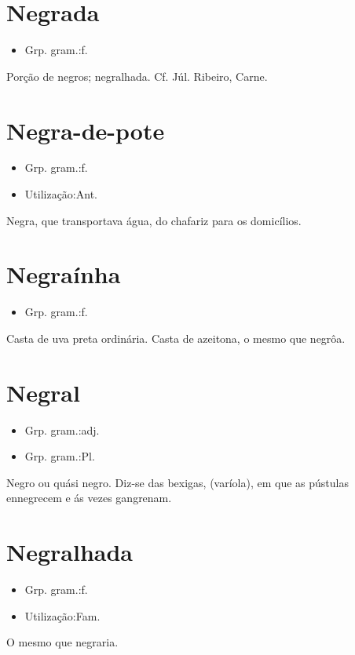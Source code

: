 \section{Negrada}
\begin{itemize}
\item {Grp. gram.:f.}
\end{itemize}
Porção de negros; negralhada. Cf. Júl. Ribeiro, \textunderscore Carne\textunderscore .
\section{Negra-de-pote}
\begin{itemize}
\item {Grp. gram.:f.}
\end{itemize}
\begin{itemize}
\item {Utilização:Ant.}
\end{itemize}
Negra, que transportava água, do chafariz para os domicílios.
\section{Negraínha}
\begin{itemize}
\item {Grp. gram.:f.}
\end{itemize}
Casta de uva preta ordinária.
Casta de azeitona, o mesmo que \textunderscore negrôa\textunderscore .
\section{Negral}
\begin{itemize}
\item {Grp. gram.:adj.}
\end{itemize}
\begin{itemize}
\item {Grp. gram.:Pl.}
\end{itemize}
Negro ou quási negro.
Diz-se das bexigas, (varíola), em que as pústulas ennegrecem e ás vezes gangrenam.
\section{Negralhada}
\begin{itemize}
\item {Grp. gram.:f.}
\end{itemize}
\begin{itemize}
\item {Utilização:Fam.}
\end{itemize}
O mesmo que \textunderscore negraria\textunderscore .
